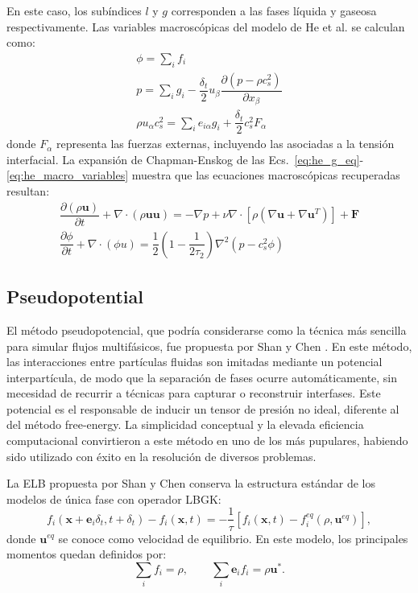 En este caso, los sub\'indices $l$ y $g$ corresponden a las fases l\'iquida y gaseosa respectivamente. Las variables macrosc\'opicas del modelo de He et al. se calculan como:
\begin{equation}
	\begin{gathered}
		\phi = \sum_i f_i \\
		p = \sum_i g_i - \dfrac{\delta_t}{2} u_{\beta} \dfrac{\partial(p - \rho c_s^2)}{\partial x_{\beta}} \\
		\rho u_{\alpha}c_s^2 = \sum_i e_{i\alpha}g_i + \dfrac{\delta_t}{2}c_s^2 F_{\alpha}
	\end{gathered}
	\label{eq:he_macro_variables}
\end{equation}
donde $F_{\alpha}$ representa las fuerzas externas, incluyendo las asociadas a la tensi\'on interfacial. La expansi\'on de Chapman-Enskog de las Ecs.~\eqref{eq:he_g_eq}-\eqref{eq:he_macro_variables} muestra que las ecuaciones macrosc\'opicas recuperadas resultan:
\begin{equation}
	\begin{gathered}
		\dfrac{\partial (\rho \bm{u})}{\partial t} + \nabla \cdot (\rho \bm{uu})  = -\nabla p  + \nu \nabla \cdot \left[ \rho (\nabla\bm{u} + \nabla \bm{u}^T) \right] + \bm{F} \\
		\dfrac{\partial \phi}{\partial t} + \nabla \cdot (\phi \bm{}u) = \dfrac{1}{2} \left( 1 - \dfrac{1}{2\tau_2} \right) \nabla^2 (p - c_s^2 \phi)
	\end{gathered}
\end{equation}




\subsection*{Pseudopotential}
El m\'etodo pseudopotencial, que podr\'ia considerarse como la t\'ecnica m\'as sencilla para simular flujos multif\'asicos, fue propuesta por Shan y Chen \cite{shan_lattice_1993,shan_simulation_1994}. En este m\'etodo, las interacciones entre part\'iculas fluidas son imitadas mediante un potencial interpart\'icula, de modo que la separaci\'on de fases ocurre autom\'aticamente, sin mecesidad de recurrir a t\'ecnicas para capturar o reconstruir interfases. Este potencial es el responsable de inducir un tensor de presi\'on no ideal, diferente al del m\'etodo free-energy. La simplicidad conceptual y la elevada eficiencia computacional convirtieron a este m\'etodo en uno de los m\'as pupulares, habiendo sido utilizado con \'exito en la resoluci\'on de diversos problemas.
\par 
La ELB propuesta por Shan y Chen conserva la estructura est\'andar de los modelos de \'unica fase con operador LBGK:
\begin{equation}
	f_i(\bm{x}+\bm{e}_i\delta_t,t+\delta_t) - f_i(\bm{x},t)= -\dfrac{1}{\tau}\left[ f_i(\bm{x},t) - f_i^{eq}(\rho,\bm{u}^{eq}) \right],
\end{equation}
donde $\bm{u}^{eq}$ se conoce como velocidad de equilibrio. En este modelo, los principales momentos quedan definidos por:
\begin{equation}
	\sum_i f_i = \rho, \qquad	\sum_i \bm{e}_if_i = \rho \bm{u}^* .
\end{equation}


